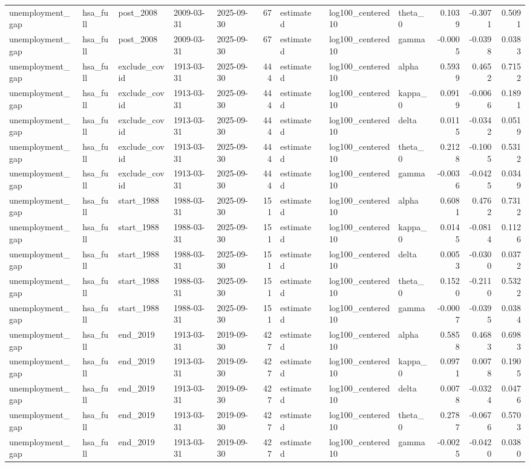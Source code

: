 \begin{tabular}{lllllrllllrrr}
unemployment\_gap & hsa\_full & post\_2008 & 2009-03-31 & 2025-09-30 & 67 & estimated &  & log100\_centered10 & theta\_0 & 0.1039 & -0.3071 & 0.5091 \\
unemployment\_gap & hsa\_full & post\_2008 & 2009-03-31 & 2025-09-30 & 67 & estimated &  & log100\_centered10 & gamma & -0.0005 & -0.0398 & 0.0383 \\
unemployment\_gap & hsa\_full & exclude\_covid & 1913-03-31 & 2025-09-30 & 444 & estimated &  & log100\_centered10 & alpha & 0.5939 & 0.4652 & 0.7152 \\
unemployment\_gap & hsa\_full & exclude\_covid & 1913-03-31 & 2025-09-30 & 444 & estimated &  & log100\_centered10 & kappa\_0 & 0.0919 & -0.0066 & 0.1891 \\
unemployment\_gap & hsa\_full & exclude\_covid & 1913-03-31 & 2025-09-30 & 444 & estimated &  & log100\_centered10 & delta & 0.0115 & -0.0342 & 0.0519 \\
unemployment\_gap & hsa\_full & exclude\_covid & 1913-03-31 & 2025-09-30 & 444 & estimated &  & log100\_centered10 & theta\_0 & 0.2128 & -0.1005 & 0.5312 \\
unemployment\_gap & hsa\_full & exclude\_covid & 1913-03-31 & 2025-09-30 & 444 & estimated &  & log100\_centered10 & gamma & -0.0036 & -0.0425 & 0.0349 \\
unemployment\_gap & hsa\_full & start\_1988 & 1988-03-31 & 2025-09-30 & 151 & estimated &  & log100\_centered10 & alpha & 0.6081 & 0.4762 & 0.7312 \\
unemployment\_gap & hsa\_full & start\_1988 & 1988-03-31 & 2025-09-30 & 151 & estimated &  & log100\_centered10 & kappa\_0 & 0.0145 & -0.0814 & 0.1126 \\
unemployment\_gap & hsa\_full & start\_1988 & 1988-03-31 & 2025-09-30 & 151 & estimated &  & log100\_centered10 & delta & 0.0053 & -0.0300 & 0.0372 \\
unemployment\_gap & hsa\_full & start\_1988 & 1988-03-31 & 2025-09-30 & 151 & estimated &  & log100\_centered10 & theta\_0 & 0.1520 & -0.2110 & 0.5322 \\
unemployment\_gap & hsa\_full & start\_1988 & 1988-03-31 & 2025-09-30 & 151 & estimated &  & log100\_centered10 & gamma & -0.0007 & -0.0395 & 0.0384 \\
unemployment\_gap & hsa\_full & end\_2019 & 1913-03-31 & 2019-09-30 & 427 & estimated &  & log100\_centered10 & alpha & 0.5858 & 0.4683 & 0.6983 \\
unemployment\_gap & hsa\_full & end\_2019 & 1913-03-31 & 2019-09-30 & 427 & estimated &  & log100\_centered10 & kappa\_0 & 0.0971 & 0.0078 & 0.1905 \\
unemployment\_gap & hsa\_full & end\_2019 & 1913-03-31 & 2019-09-30 & 427 & estimated &  & log100\_centered10 & delta & 0.0078 & -0.0324 & 0.0476 \\
unemployment\_gap & hsa\_full & end\_2019 & 1913-03-31 & 2019-09-30 & 427 & estimated &  & log100\_centered10 & theta\_0 & 0.2787 & -0.0676 & 0.5703 \\
unemployment\_gap & hsa\_full & end\_2019 & 1913-03-31 & 2019-09-30 & 427 & estimated &  & log100\_centered10 & gamma & -0.0025 & -0.0420 & 0.0380 \\
\bottomrule
\end{tabular}
